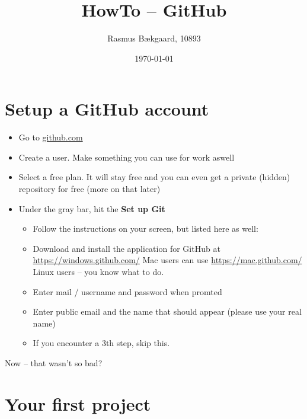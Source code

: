 \documentclass{article}
\title{HowTo -- GitHub}
\author{Rasmus Bækgaard, 10893}
\date{\today}
\begin{document}
\maketitle

\section{Setup a GitHub account}

\begin{itemize}
\item Go to \url{github.com}

\item Create a user.
\subitem Make something you can use for work aswell

\item Select a free plan. 
It will stay free and you can even get a private (hidden) repository for free (more on that later)

\item Under the gray bar, hit the \textbf{Set up Git}

	\begin{itemize}
	\item[] Follow the instructions on your screen, but listed here as well:

	\item Download and install the application for GitHub at \url{https://windows.github.com/} 
	\subitem Mac users can use \url{https://mac.github.com/}
	\subitem Linux users -- you know what to do.

	\item Enter mail / username and password when promted

	\item Enter public email and the name that should appear (please use your real name)

	\item If you encounter a 3th step, skip this.
	\end{itemize}

\end{itemize}

Now -- that wasn't so bad?


\section{Your first project}
\end{document}
